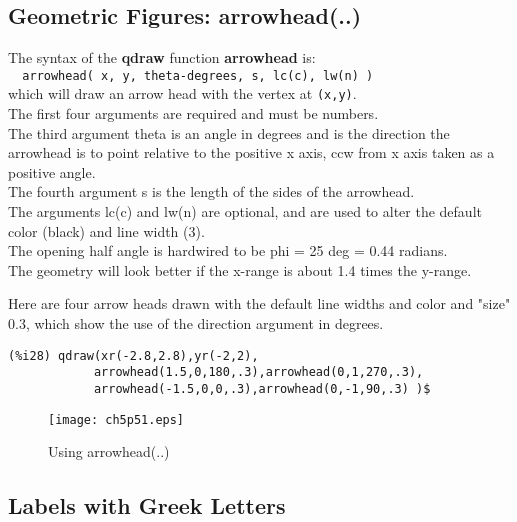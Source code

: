 \documentclass[12pt]{article}
\begin{document}
\subsection{Geometric Figures: arrowhead(..) }
The syntax of the \textbf{qdraw} function \textbf{arrowhead} is:\\
\verb|  arrowhead( x, y, theta-degrees, s, lc(c), lw(n) )|\\
  which will draw an arrow head with the vertex at \verb|(x,y)|.\\
The first four arguments are required and must be numbers.\\
The third argument theta is an angle in degrees and is the direction
  the arrowhead is to point relative to the positive x axis,
  ccw from x axis taken as a positive angle.\\
The fourth argument s is the length of the sides of the arrowhead.\\
The arguments lc(c) and lw(n) are optional, and are used to
  alter the default color (black) and line width (3).\\
The opening half angle is hardwired to be phi = 25 deg = 0.44 radians.\\
The geometry will look better if the x-range is about 1.4 times the y-range.

\smallskip
Here are four arrow heads drawn with the default line widths and color
  and "size" $0.3$, which show the use of the direction argument in degrees.
\small
\begin{verbatim}
(%i28) qdraw(xr(-2.8,2.8),yr(-2,2),
            arrowhead(1.5,0,180,.3),arrowhead(0,1,270,.3),
            arrowhead(-1.5,0,0,.3),arrowhead(0,-1,90,.3) )$
\end{verbatim}
\normalsize
%			 
\begin{figure} [h]
   \centerline{\texttt{[image: ch5p51.eps]} }
	\caption{Using arrowhead(..)}
\end{figure}      

\smallskip

\subsection{Labels with Greek Letters}
\end{document}
